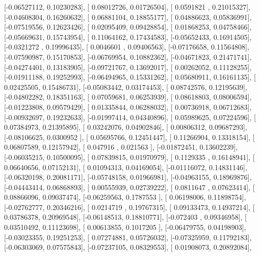 \documentclass{article}
\begin{document}
       [-0.06527112,  0.10230283],
       [ 0.08012726,  0.01726504],
       [ 0.0591821 ,  0.21015327],
       [-0.04608304,  0.16260632],
       [ 0.06881104,  0.18855177],
       [ 0.04886623,  0.05836991],
       [-0.07519556,  0.12623426],
       [ 0.02095409,  0.09428854],
       [ 0.01868253,  0.04758466],
       [-0.05669631,  0.15743954],
       [ 0.11064162,  0.17434583],
       [-0.05652433,  0.16914505],
       [-0.0321272 ,  0.19996435],
       [ 0.0046601 ,  0.09406563],
       [-0.07176658,  0.11564808],
       [-0.07590987,  0.15170853],
       [-0.06769954,  0.10882362],
       [-0.04671823,  0.21471741],
       [-0.04274401,  0.13183905],
       [-0.09721767,  0.13692017],
       [ 0.00262052,  0.11128255],
       [-0.01911188,  0.19252993],
       [-0.06494965,  0.15331262],
       [ 0.05680911,  0.16161135],
       [ 0.02425505,  0.15486731],
       [-0.05083442,  0.03174453],
       [ 0.08742576,  0.12195639],
       [-0.04802282,  0.18351163],
       [ 0.07059681,  0.06253939],
       [ 0.08618803,  0.08006594],
       [-0.01223808,  0.09579429],
       [ 0.01335844,  0.06288032],
       [ 0.00736918,  0.06712683],
       [-0.00932697,  0.19232633],
       [-0.01997414,  0.04340896],
       [ 0.05989625,  0.07224596],
       [ 0.07384973,  0.21395895],
       [ 0.03242076,  0.04902846],
       [ 0.00806312,  0.09687293],
       [-0.08106625,  0.0300952 ],
       [ 0.05695766,  0.12451447],
       [ 0.11266904,  0.13318154],
       [ 0.06807589,  0.12157942],
       [ 0.047916  ,  0.021563  ],
       [-0.01872451,  0.13602239],
       [-0.06035215,  0.10500095],
       [ 0.07839815,  0.01970979],
       [ 0.1129335 ,  0.16148941],
       [ 0.06640656,  0.07152131],
       [ 0.01094313,  0.04169054],
       [-0.01116072,  0.14831146],
       [-0.06320198,  0.20081171],
       [-0.05748158,  0.01966981],
       [-0.04963155,  0.18969876],
       [-0.04443414,  0.06868893],
       [ 0.00555939,  0.02739222],
       [ 0.0811647 ,  0.07623414],
       [ 0.08866096,  0.09037474],
       [-0.06259563,  0.1787553 ],
       [ 0.06198006,  0.11898754],
       [-0.02762777,  0.20346216],
       [ 0.0214719 ,  0.19767315],
       [ 0.09133473,  0.14937214],
       [ 0.03786378,  0.20969548],
       [-0.06148513,  0.18810771],
       [-0.072403  ,  0.09346958],
       [ 0.03510492,  0.11123698],
       [ 0.00613855,  0.1017205 ],
       [-0.06479755,  0.04198903],
       [-0.03023355,  0.19251253],
       [ 0.07274881,  0.05726032],
       [-0.07325959,  0.11792183],
       [-0.06303069,  0.07575843],
       [-0.07237105,  0.08329553],
       [ 0.01908073,  0.20892084],
\end{document}
